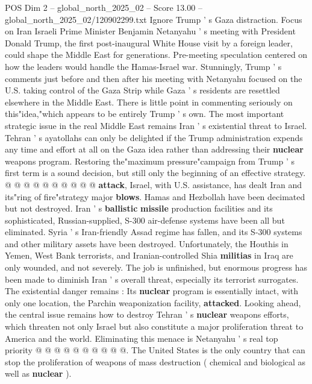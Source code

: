 \begin{textsample}{POS Dim 2 – global\_north\_2025\_02 – Score 13.00 – global\_north\_2025\_02/120902299.txt}  \label{ex:f2_pos_437}
Ignore Trump ' s Gaza distraction.
Focus on Iran Israeli Prime Minister Benjamin Netanyahu ' s meeting with President Donald Trump, the first post-inaugural White House visit by a foreign leader, could shape the Middle East for generations.
Pre-meeting speculation centered on how the leaders would handle the Hamas-Israel war.
Stunningly, Trump ' s comments just before and then after his meeting with Netanyahu focused on the U.S. taking control of the Gaza Strip while Gaza ' s residents are resettled elsewhere in the Middle East.
There is little point in commenting seriously on this"idea,"which appears to be entirely Trump ' s own.
The most important strategic issue in the real Middle East remains Iran ' s existential threat to Israel.
Tehran ' s ayatollahs can only be delighted if the Trump administration expends any time and effort at all on the Gaza idea rather than addressing their \textbf{nuclear} weapons program.
Restoring the"maximum pressure"campaign from Trump ' s first term is a sound decision, but still only the beginning of an effective strategy. @ @ @ @ @ @ @ @ @ @ \textbf{attack}, Israel, with U.S. assistance, has dealt Iran and its"ring of fire"strategy major \textbf{blows}.
Hamas and Hezbollah have been decimated but not destroyed.
Iran ' s \textbf{ballistic} \textbf{missile} production facilities and its sophisticated, Russian-supplied, S-300 air-defense systems have been all but eliminated.
Syria ' s Iran-friendly Assad regime has fallen, and its S-300 systems and other military assets have been destroyed.
Unfortunately, the Houthis in Yemen, West Bank terrorists, and Iranian-controlled Shia \textbf{militias} in Iraq are only wounded, and not severely.
The job is unfinished, but enormous progress has been made to diminish Iran ' s overall threat, especially its terrorist surrogates.
The existential danger remains : Its \textbf{nuclear} program is essentially intact, with only one location, the Parchin weaponization facility, \textbf{attacked}.
Looking ahead, the central issue remains how to destroy Tehran ' s \textbf{nuclear} weapons efforts, which threaten not only Israel but also constitute a major proliferation threat to America and the world.
Eliminating this menace is Netanyahu ' s real top priority @ @ @ @ @ @ @ @ @ @.
The United States is the only country that can stop the proliferation of weapons of mass destruction ( chemical and biological as well as \textbf{nuclear} ).

\end{textsample}
